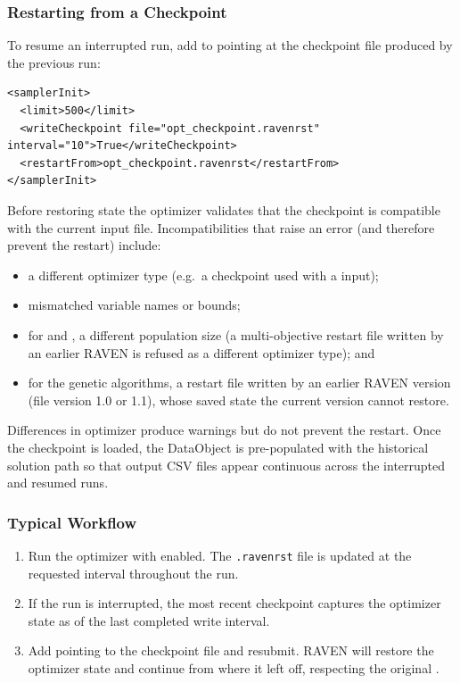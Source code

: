 \subsubsection{Restarting from a Checkpoint}
To resume an interrupted run, add  to  pointing at
the checkpoint file produced by the previous run:
\begin{lstlisting}[style=XML]
<samplerInit>
  <limit>500</limit>
  <writeCheckpoint file="opt_checkpoint.ravenrst" interval="10">True</writeCheckpoint>
  <restartFrom>opt_checkpoint.ravenrst</restartFrom>
</samplerInit>
\end{lstlisting}
Before restoring state the optimizer validates that the checkpoint is compatible with the current
input file.  Incompatibilities that raise an error (and therefore prevent the restart) include:
\begin{itemize}
  \item a different optimizer type (e.g.\ a  checkpoint used with a
     input);
  \item mismatched variable names or bounds;
  \item for  and , a different
    population size (a multi-objective restart file written by an earlier RAVEN
     is refused as a different optimizer type); and
  \item for the genetic algorithms, a restart file written by an earlier RAVEN version (file version
    1.0 or 1.1), whose saved state the current version cannot restore.
\end{itemize}
Differences in optimizer  produce warnings but do not prevent the restart.  Once the checkpoint is loaded, the  DataObject is
pre-populated with the historical solution path so that output CSV files appear continuous
across the interrupted and resumed runs.

\subsubsection{Typical Workflow}
\begin{enumerate}
  \item Run the optimizer with  enabled.  The \texttt{.ravenrst} file
    is updated at the requested interval throughout the run.
  \item If the run is interrupted, the most recent checkpoint captures the optimizer state as of
    the last completed write interval.
  \item Add  pointing to the checkpoint file and resubmit.  RAVEN will
    restore the optimizer state and continue from where it left off, respecting the original
    .
\end{enumerate}

